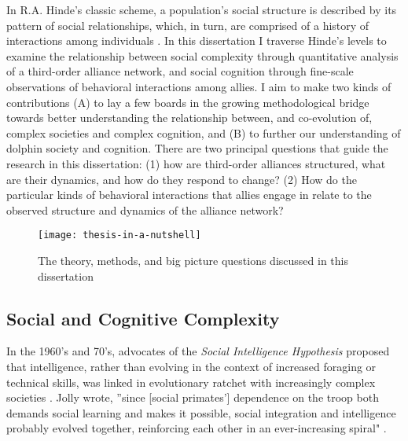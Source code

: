 \documentclass[11pt]{amsart}
\begin{document}
In R.A. Hinde's classic scheme, a population's social structure is described by its pattern of social relationships, which, in turn, are comprised of a history of interactions among individuals \citep{hinde:1976}. In this dissertation I traverse Hinde's levels to examine the relationship between social complexity through quantitative analysis of a third-order alliance network, and social cognition through fine-scale observations of behavioral interactions among allies. I aim to make two kinds of contributions (A) to lay a few boards in the growing methodological bridge towards better understanding the relationship between, and co-evolution of, complex societies and complex cognition, and (B) to further our understanding of dolphin society and cognition. There are two principal questions that guide the research in this dissertation: (1) how are third-order alliances structured, what are their dynamics, and how do they respond to change? (2) How do the particular kinds of behavioral interactions that allies engage in relate to the observed structure and dynamics of the alliance network?

\begin{figure}[h]
  \centering
    \texttt{[image: thesis-in-a-nutshell]}
  \caption{The theory, methods, and big picture questions discussed in this dissertation}
  \label{fig:dissertationNutshell}
\end{figure}

\subsection{Social and Cognitive Complexity}

In the 1960's and 70's, advocates of the \textit{Social Intelligence Hypothesis} proposed that intelligence, rather than %
evolving in the context of increased foraging or technical skills, was linked in evolutionary ratchet with increasingly complex societies \citep{jolly:1966,humphrey:1976}. Jolly wrote, ''since [social primates'] dependence on the troop both demands social learning and makes it possible, social integration and intelligence probably evolved together, reinforcing each other in an ever-increasing spiral" \citep[p 504]{jolly:1966}. 
\end{document}
